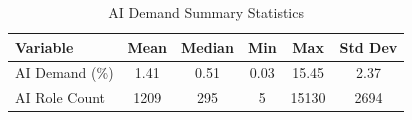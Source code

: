 \begin{table}[htbp]
\caption{AI Demand Summary Statistics}
\label{tab:ai_demand_summary}
\begin{tabular}{lccccc}
\hline\hline
Variable & Mean & Median & Min & Max & Std Dev \\
\hline
AI Demand (\%) & 1.41 & 0.51 & 0.03 & 15.45 & 2.37 \\
AI Role Count & 1209 & 295 & 5 & 15130 & 2694 \\
\hline\hline
\end{tabular}
\end{table}

